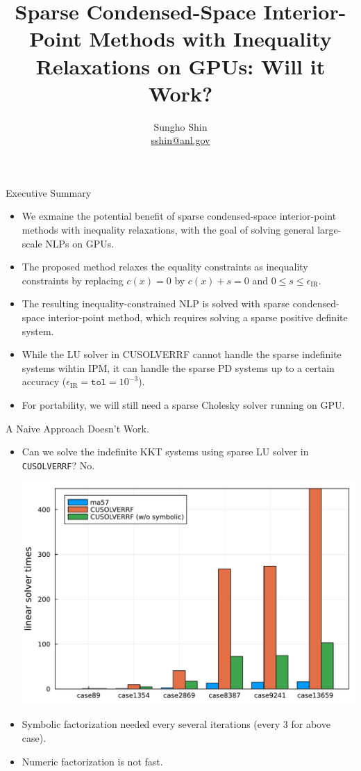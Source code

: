 

\title{{\bfseries Sparse Condensed-Space Interior-Point Methods with Inequality Relaxations on GPUs: Will it Work?}}

\graphicspath{}

\author[Sungho Shin]{
  Sungho Shin\\
  {\normalfont\footnotesize\url{sshin@anl.gov}}
}
\subtitle{}



{
}

\begin{frame}{Executive Summary}
  \begin{itemize}
  \item We exmaine the potential benefit of sparse condensed-space interior-point methods with inequality relaxations, with the goal of solving general large-scale NLPs on GPUs.
  \item The proposed method relaxes the equality constraints as inequality constraints by replacing $c(x) =0$ by $c(x)+ s=0$ and $0\leq s\leq\epsilon_{\text{IR}}$.
  \item The resulting inequality-constrained NLP is solved with sparse condensed-space interior-point method, which requires solving a sparse positive definite system.
  \item While the LU solver in CUSOLVERRF cannot handle the sparse indefinite systems wihtin IPM, it can handle the sparse PD systems up to a certain accuracy ($\epsilon_{\text{IR}}=\texttt{tol} = 10^{-3}$).
  \item For portability, we will still need a sparse Cholesky solver running on GPU.
  \end{itemize}
\end{frame}

\begin{frame}{A Naive Approach Doesn't Work.}
  \begin{itemize}
  \item Can we solve the indefinite KKT systems using sparse LU solver in \texttt{CUSOLVERRF}? No.
    \begin{center}
      \includegraphics[width=.5\textwidth]{../fig/linear_solvers.pdf}  
    \end{center}   
  \item Symbolic factorization needed every several iterations (every 3 for above case).
  \item Numeric factorization is not fast.
  \end{itemize}  
\end{frame}

